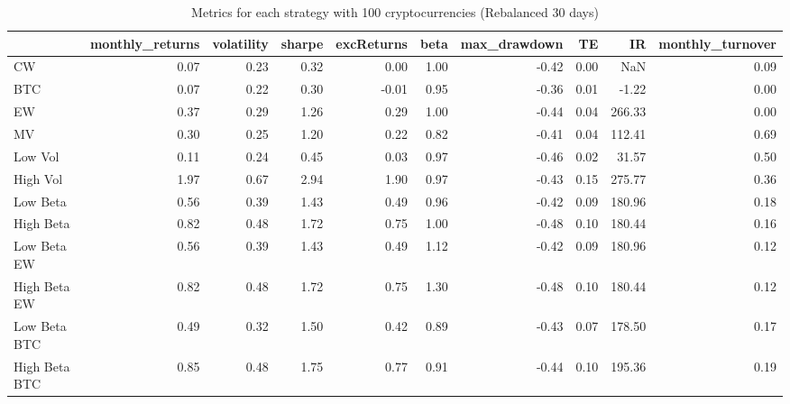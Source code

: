 \begin{table}
\centering
\caption{Metrics for each strategy with 100 cryptocurrencies (Rebalanced 30 days)}
\label{metrics100_30}
\begin{tabular}{lrrrrrrrrr}
\toprule
{} &  monthly\_returns &  volatility &  sharpe &  excReturns &  beta &  max\_drawdown &   TE &     IR &  monthly\_turnover \\
\midrule
CW            &             0.07 &        0.23 &    0.32 &        0.00 &  1.00 &         -0.42 & 0.00 &    NaN &              0.09 \\
BTC           &             0.07 &        0.22 &    0.30 &       -0.01 &  0.95 &         -0.36 & 0.01 &  -1.22 &              0.00 \\
EW            &             0.37 &        0.29 &    1.26 &        0.29 &  1.00 &         -0.44 & 0.04 & 266.33 &              0.00 \\
MV            &             0.30 &        0.25 &    1.20 &        0.22 &  0.82 &         -0.41 & 0.04 & 112.41 &              0.69 \\
Low Vol       &             0.11 &        0.24 &    0.45 &        0.03 &  0.97 &         -0.46 & 0.02 &  31.57 &              0.50 \\
High Vol      &             1.97 &        0.67 &    2.94 &        1.90 &  0.97 &         -0.43 & 0.15 & 275.77 &              0.36 \\
Low Beta      &             0.56 &        0.39 &    1.43 &        0.49 &  0.96 &         -0.42 & 0.09 & 180.96 &              0.18 \\
High Beta     &             0.82 &        0.48 &    1.72 &        0.75 &  1.00 &         -0.48 & 0.10 & 180.44 &              0.16 \\
Low Beta EW   &             0.56 &        0.39 &    1.43 &        0.49 &  1.12 &         -0.42 & 0.09 & 180.96 &              0.12 \\
High Beta EW  &             0.82 &        0.48 &    1.72 &        0.75 &  1.30 &         -0.48 & 0.10 & 180.44 &              0.12 \\
Low Beta BTC  &             0.49 &        0.32 &    1.50 &        0.42 &  0.89 &         -0.43 & 0.07 & 178.50 &              0.17 \\
High Beta BTC &             0.85 &        0.48 &    1.75 &        0.77 &  0.91 &         -0.44 & 0.10 & 195.36 &              0.19 \\
\bottomrule
\end{tabular}
\end{table}
